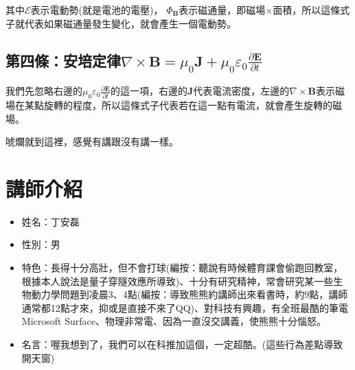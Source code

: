 其中$\mathcal{E}$表示電動勢(就是電池的電壓)， $\Phi_{\mathbf{B}}$表示磁通量，即磁場$\times$面積，所以這條式子就代表如果磁通量發生變化，就會產生一個電動勢。

\subsection{第四條：安培定律\texorpdfstring{$\nabla \times \mathbf{B}=\mu_{0} \mathbf{J}+\mu_{0} \varepsilon_{0} \frac{\partial \mathbf{E}}{\partial t}$}{TEXT}}
我們先忽略右邊的$\mu_{0} \varepsilon_{0} \frac{\partial \mathbf{E}}{\partial t}$的這一項，右邊的$\mathbf{J}$代表電流密度，左邊的$\nabla \times \mathbf{B}$表示磁場在某點旋轉的程度，所以這條式子代表若在這一點有電流，就會產生旋轉的磁場。

唬爛就到這裡，感覺有講跟沒有講一樣。

\section{講師介紹}
\begin{itemize}
\item 姓名：丁安磊
\item 性別：男
\item 特色：長得十分高壯，但不會打球(編按：聽說有時候體育課會偷跑回教室，根據本人說法是量子穿隧效應所導致)、十分有研究精神，常會研究某一些生物動力學問題到凌晨3、4點(編按：導致熊熊約講師出來看書時，約9點，講師通常都12點才來，抑或是直接不來了QQ)、對科技有興趣，有全班最酷的筆電Microsoft Surface、物理非常電、因為一直沒交講義，使熊熊十分惱怒。
\item 名言：喔我想到了，我們可以在科推加這個，一定超酷。(這些行為差點導致開天窗)
\end{itemize}
